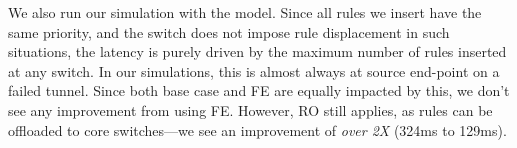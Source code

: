 

We also run our simulation with the \Intel model. Since all rules we insert
have the same priority, and the \Intel switch does not impose rule
displacement in such situations, the latency is purely driven by the maximum
number of rules inserted at any switch. In our simulations, this is almost
always at source end-point on a failed tunnel. Since both base case and FE
are equally impacted by this, we don't see any improvement from using FE.
However, RO still applies, as rules can be offloaded to core switches---we
see an improvement of {\em over 2X} (324ms to 129ms).


 



\begin{figure}[!tb]
\centering
{}
\vspace{-1em}
\label{failoverResults}
\end{figure}

